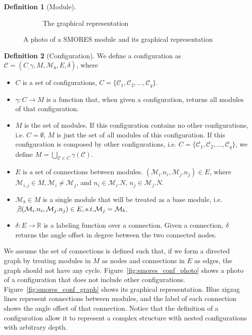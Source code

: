 \documentclass[conference]{IEEEtran}
\theoremstyle{definition}
\newtheorem{definition}{Definition}[section]
\begin{document}
\begin{definition}[Module]
\begin{figure}
\begin{center}
\begin{subfigure}[b]{0.4\columnwidth}
                \caption{The graphical representation}
                \label{fig:smores_graph}
        \end{subfigure}
\end{center}
\caption{A photo of a SMORES module and its graphical representation}
\label{fig:smores}
\end{figure}
\end{definition}

\begin{definition}[Configuration] \label{def:configuration}
We define a configuration as $\mathcal{C}=(C_, \gamma, M, \mathcal{M}_b, E, \delta)$, where
\begin{itemize}
\item $C$ is a set of configurations, $C=\{\mathcal{C}_{1}, \mathcal{C}_{2}, ..., \mathcal{C}_{q}\}$.
\item $\gamma: C \rightarrow M$ is a function that, when given a configuration, returns all modules of that configuration.
\item $M$ is the set of modules. If this configuration contains no other configurations, i.e. $C = \emptyset$, $M$ is just the set of all modules of this configuration. If this configuration is composed by other configurations, i.e. $C=\{\mathcal{C}_{1}, \mathcal{C}_{2}, ..., \mathcal{C}_{q}\}$, we define $M=\bigcup_{\mathcal{C}\in C}{\gamma(\mathcal{C})}$.
\item $E$ is a set of connections between modules. $(\mathcal{M}_i.n_i, \mathcal{M}_j.n_j)\in E$, where $\mathcal{M}_{i,j} \in M, \mathcal{M}_i \neq \mathcal{M}_j$, and $n_i\in \mathcal{M}_i.N$, $n_j\in \mathcal{M}_j.N$.
\item $\mathcal{M}_b\in M$ is a single module that will be treated as a base module, i.e. $\not\exists (\mathcal{M}_i.n_i, \mathcal{M}_j.n_j)\in E, s.t. \mathcal{M}_j=\mathcal{M}_b$.
\item $\delta: E \rightarrow \mathbb{R}$ is a labeling function over a connection. Given a connection, $\delta$ returns the angle offset in degree between the two connected nodes.
\end{itemize}
We assume the set of connections is defined such that, if we form a directed graph by treating modules in $M$ as nodes and connections in $E$ as edges, the graph should not have any cycle. Figure~\ref{fig:smores_conf_photo} shows a photo of a configuration that does not include other configurations. Figure~\ref{fig:smores_conf_graph} shows its
graphical representation. Blue zigzag lines represent connections between
modules, and the label of each connection shows the angle offset of that
connection. Notice that the definition of a configuration allow it to represent a complex structure with nested configurations with arbitrary depth.
\end{definition}
\end{document}

